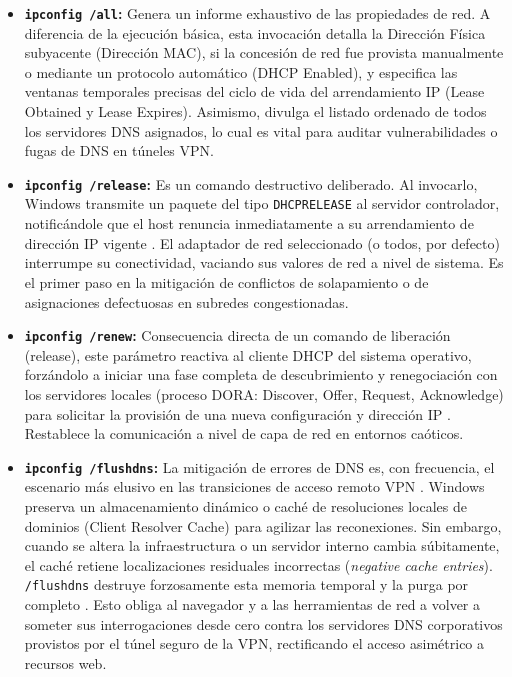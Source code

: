 \documentclass[a4paper,12pt]{article}
\begin{document}
\begin{itemize}
    \item \textbf{\texttt{ipconfig /all}:} 
    Genera un informe exhaustivo de las propiedades de red. A diferencia de la ejecución básica, esta invocación detalla la Dirección Física subyacente (Dirección MAC), si la concesión de red fue provista manualmente o mediante un protocolo automático (DHCP Enabled), y especifica las ventanas temporales precisas del ciclo de vida del arrendamiento IP (Lease Obtained y Lease Expires). Asimismo, divulga el listado ordenado de todos los servidores DNS asignados, lo cual es vital para auditar vulnerabilidades o fugas de DNS en túneles VPN.

    \item \textbf{\texttt{ipconfig /release}:} 
    Es un comando destructivo deliberado. Al invocarlo, Windows transmite un paquete del tipo \texttt{DHCPRELEASE} al servidor controlador, notificándole que el host renuncia inmediatamente a su arrendamiento de dirección IP vigente \cite{ms_learn_ipconfig_renew}. El adaptador de red seleccionado (o todos, por defecto) interrumpe su conectividad, vaciando sus valores de red a nivel de sistema. Es el primer paso en la mitigación de conflictos de solapamiento o de asignaciones defectuosas en subredes congestionadas.

    \item \textbf{\texttt{ipconfig /renew}:} 
    Consecuencia directa de un comando de liberación (release), este parámetro reactiva al cliente DHCP del sistema operativo, forzándolo a iniciar una fase completa de descubrimiento y renegociación con los servidores locales (proceso DORA: Discover, Offer, Request, Acknowledge) para solicitar la provisión de una nueva configuración y dirección IP \cite{ms_learn_ipconfig_renew}. Restablece la comunicación a nivel de capa de red en entornos caóticos.

    \item \textbf{\texttt{ipconfig /flushdns}:} 
    La mitigación de errores de DNS es, con frecuencia, el escenario más elusivo en las transiciones de acceso remoto VPN \cite{ms_learn_ipconfig_renew}. Windows preserva un almacenamiento dinámico o caché de resoluciones locales de dominios (Client Resolver Cache) para agilizar las reconexiones. Sin embargo, cuando se altera la infraestructura o un servidor interno cambia súbitamente, el caché retiene localizaciones residuales incorrectas (\textit{negative cache entries}). \texttt{/flushdns} destruye forzosamente esta memoria temporal y la purga por completo \cite{ms_learn_ipconfig}. Esto obliga al navegador y a las herramientas de red a volver a someter sus interrogaciones desde cero contra los servidores DNS corporativos provistos por el túnel seguro de la VPN, rectificando el acceso asimétrico a recursos web.
\end{itemize}
\end{document}
